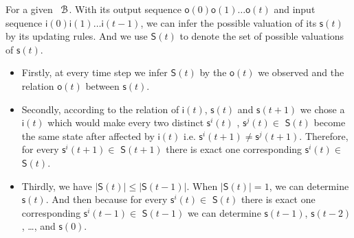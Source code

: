 For a given \BCN\  ${\mathcal{B}}$. With its output sequence $\mathsf{o}(0)\mathsf{o}(1)\ldots\mathsf{o}(t)$ and input sequence $\mathsf{i}(0)\mathsf{i}(1)\ldots\mathsf{i}(t-1)$, we can infer the possible valuation of its $\mathsf{s}(t)$ by its updating rules. And  we use $\mathsf{S}(t)$ to denote the set of possible valuations of $\mathsf{s}(t)$. %
\begin{itemize}
	\item  Firstly, at every time step we infer $\mathsf{S}(t)$ by the $\mathsf{o}(t)$ we observed and the relation $\mathsf{o}(t)$ between $\mathsf{s}(t)$.
	\item Secondly, according to the relation of $\mathsf{i}(t)$, $\mathsf{s}(t)$ and $\mathsf{s}(t+1)$ we chose a $\mathsf{i}(t)$ which would make every two distinct $\mathsf{s}^{i}(t)$ , $\mathsf{s}^{j}(t)$$\in$ $\mathsf{S}(t)$ become the same state after affected by $\mathsf{i}(t)$ i.e. $\mathsf{s}^{i}(t+1)\ne\mathsf{s}^{j}(t+1)$. Therefore, for every $\mathsf{s}^{i}(t+1)\in $ $\mathsf{S}(t+1)$ there is exact one corresponding $\mathsf{s}^{i}(t)\in $ $\mathsf{S}(t)$.
	\item Thirdly, we have $|$$\mathsf{S}(t)$$|\le|$$\mathsf{S}(t-1)$$|$. When $|$$\mathsf{S}(t)$$|=1$, we can determine $\mathsf{s}(t)$. And then because for every $\mathsf{s}^{i}(t)\in $ $\mathsf{S}(t)$ there is exact one corresponding $\mathsf{s}^{i}(t-1)\in $ $\mathsf{S}(t-1)$ we can determine $\mathsf{s}(t-1)$, $\mathsf{s}(t-2)$, \ldots, and $\mathsf{s}(0)$.
\end{itemize}

\begin{comment}
 The input \Input$(t)$ we chose should make every two distinct states \State$^{i}(t)$ , \State$^{j}(t)$$\in$ \Ustate$(t)$ will not turn into be the same state after affected by \Input$(t)$.  \ly{Therefore,   there is exact one $s\in $ \Ustate$(t)$ such that $s\xrightarrow
{i(t)} s_1$ for each $s_1\in $ \Ustate$(t+1)$.} And the \Ustate$(t+1)$ is derived by the input \Input$(t)$ and \Output$(t+1)$, and we have $|$\Ustate$(t+1)$$|\le|$\Ustate$(t)$$|$. If $|$\Ustate$(t+1)$$|=1$,  we can determine \State$(t+1)$.  Employing the update rules and \Input$(t)$, we can determine the  \State$(t)$.  Repeating this step, we  determine the initial state \State$(0)$ of the \BCN.
\end{comment}

\begin{comment} 
 But we can also determine the set of possible initial states \Ustate$(0)$ by initial output \Output$(0)$ we observe, and then we can use different input sequences (\Input$^{1}(0)$\Input$^{1}(1)\ldots$\Input$^{1}(k)$, \Input$^{2}(0)$\Input$^{2}(1)\ldots$\Input$^{2}(k)$, $\ldots$) to determine initial state for different sets of possible initial states (\Ustate$^{1}(0)$, \Ustate$^{2}(0)$, $\ldots$). In this case, the requirements for \BCNs\ to determine the initail state would be easier to satisfy. 
\end{comment}

